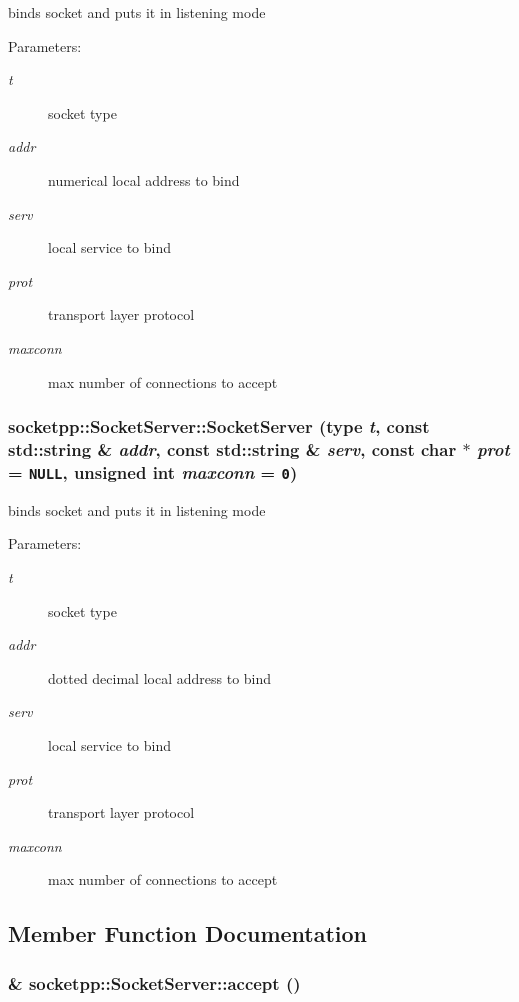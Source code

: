 binds socket and puts it in listening mode 

\begin{Desc}
\item[Parameters:]
\begin{description}
\item[{\em t}]socket type \item[{\em addr}]numerical local address to bind \item[{\em serv}]local service to bind \item[{\em prot}]transport layer protocol \item[{\em maxconn}]max number of connections to accept \end{description}
\end{Desc}
\hypertarget{classsocketpp_1_1SocketServer_667f8c2b7b1325c80f018ecf85a9551f}{
\subsubsection{\setlength{\rightskip}{0pt plus 5cm}socketpp::SocketServer::SocketServer (type {\em t}, \/  const std::string \& {\em addr}, \/  const std::string \& {\em serv}, \/  const char $\ast$ {\em prot} = {\tt NULL}, \/  unsigned int {\em maxconn} = {\tt 0})}}
\label{classsocketpp_1_1SocketServer_667f8c2b7b1325c80f018ecf85a9551f}


binds socket and puts it in listening mode 

\begin{Desc}
\item[Parameters:]
\begin{description}
\item[{\em t}]socket type \item[{\em addr}]dotted decimal local address to bind \item[{\em serv}]local service to bind \item[{\em prot}]transport layer protocol \item[{\em maxconn}]max number of connections to accept \end{description}
\end{Desc}


\subsection{Member Function Documentation}
\hypertarget{classsocketpp_1_1SocketServer_de24bd723d353d62d034718a1d95c02f}{
\subsubsection{ \& socketpp::SocketServer::accept ()}}
\label{classsocketpp_1_1SocketServer_de24bd723d353d62d034718a1d95c02f}


